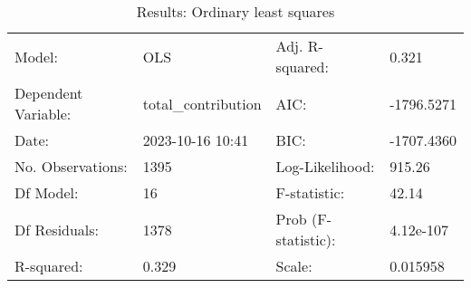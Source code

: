 \begin{table}
\caption{Results: Ordinary least squares}
\label{}
\begin{center}
\begin{tabular}{llll}
\hline
Model:              & OLS                 & Adj. R-squared:     & 0.321       \\
Dependent Variable: & total\_contribution & AIC:                & -1796.5271  \\
Date:               & 2023-10-16 10:41    & BIC:                & -1707.4360  \\
No. Observations:   & 1395                & Log-Likelihood:     & 915.26      \\
Df Model:           & 16                  & F-statistic:        & 42.14       \\
Df Residuals:       & 1378                & Prob (F-statistic): & 4.12e-107   \\
R-squared:          & 0.329               & Scale:              & 0.015958    \\
\hline
\end{tabular}
\end{center}


\end{table}
